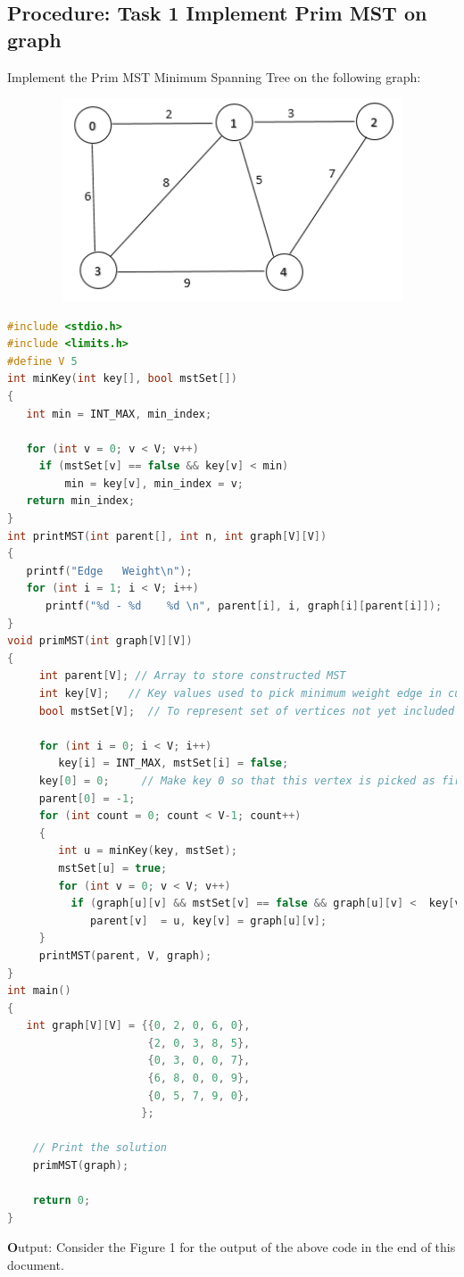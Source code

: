 \documentclass[11pt]{article}            %
\begin{document}
\subsection{Procedure: Task 1 Implement Prim MST on graph}
Implement the Prim MST Minimum Spanning Tree on the following graph:
\begin{figure}[H]
\centering
  \includegraphics[width=12cm,height=6cm,keepaspectratio]{graph.png}    
\end{figure}
\begin{lstlisting}[language=C++]
#include <stdio.h>
#include <limits.h>
#define V 5
int minKey(int key[], bool mstSet[])
{
   int min = INT_MAX, min_index;
 
   for (int v = 0; v < V; v++)
     if (mstSet[v] == false && key[v] < min)
         min = key[v], min_index = v;
   return min_index;
}
int printMST(int parent[], int n, int graph[V][V])
{
   printf("Edge   Weight\n");
   for (int i = 1; i < V; i++)
      printf("%d - %d    %d \n", parent[i], i, graph[i][parent[i]]);
}
void primMST(int graph[V][V])
{
     int parent[V]; // Array to store constructed MST
     int key[V];   // Key values used to pick minimum weight edge in cut
     bool mstSet[V];  // To represent set of vertices not yet included in MST

     for (int i = 0; i < V; i++)
        key[i] = INT_MAX, mstSet[i] = false;
     key[0] = 0;     // Make key 0 so that this vertex is picked as first vertex
     parent[0] = -1;
     for (int count = 0; count < V-1; count++)
     {
        int u = minKey(key, mstSet);
        mstSet[u] = true;
        for (int v = 0; v < V; v++)
          if (graph[u][v] && mstSet[v] == false && graph[u][v] <  key[v])
             parent[v]  = u, key[v] = graph[u][v];
     }
     printMST(parent, V, graph);
}
int main()
{
   int graph[V][V] = {{0, 2, 0, 6, 0},
                      {2, 0, 3, 8, 5},
                      {0, 3, 0, 0, 7},
                      {6, 8, 0, 0, 9},
                      {0, 5, 7, 9, 0},
                     };
 
    // Print the solution
    primMST(graph);
 
    return 0;
}
\end{lstlisting}
 \textbf Output: Consider the Figure 1 for the output of the above code in the end of this document.
\end{document}
